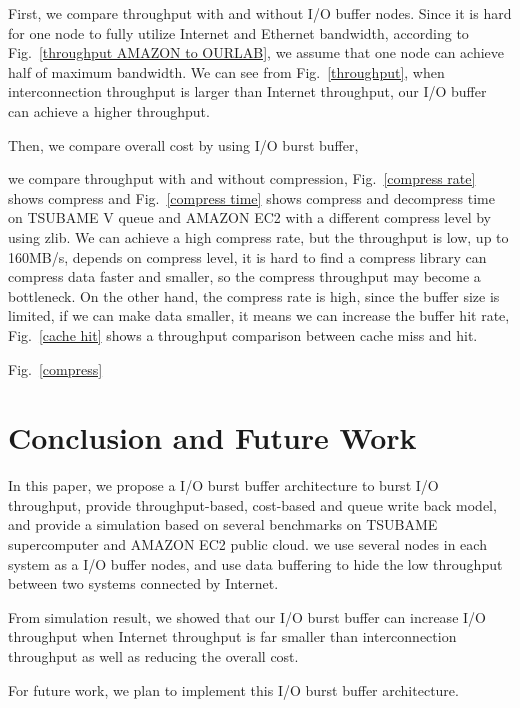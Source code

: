 \documentclass[JIP,draft]{ipsj}
\begin{document}
First, we compare throughput with and without I/O buffer nodes.
Since it is hard for one node to fully utilize Internet and Ethernet bandwidth, according to Fig.~\ref{throughput AMAZON to OURLAB}, we assume that one node can achieve half of maximum bandwidth.
We can see from Fig.~\ref{throughput}, when interconnection throughput is larger than Internet throughput, our I/O buffer can achieve a higher throughput.

Then, we compare overall cost by using I/O burst buffer, 

we compare throughput with and without compression, Fig.~\ref{compress rate} shows compress and Fig.~\ref{compress time} shows compress and decompress time on TSUBAME V queue and AMAZON EC2 with a different compress level by using zlib\cite{zlib}.
We can achieve a high compress rate, but the throughput is low, up to 160MB/s, depends on compress level, it is hard to find a compress library can compress data faster and smaller, so the compress throughput may become a bottleneck.
On the other hand, the compress rate is high, since the buffer size is limited, if we can make data smaller, it means we can increase the buffer hit rate, Fig.~\ref{cache hit} shows a throughput comparison between cache miss and hit.

Fig.~\ref{compress}
\section{Conclusion and Future Work}

In this paper, we propose a I/O burst buffer architecture to burst I/O throughput, provide throughput-based, cost-based and queue write back model, and provide a simulation based on several benchmarks on TSUBAME supercomputer and AMAZON EC2 public cloud.
we use several nodes in each system as a I/O buffer nodes, and use data buffering to hide the low throughput between two systems connected by Internet.

From simulation result, we showed that our I/O burst buffer can increase I/O throughput when Internet throughput is far smaller than interconnection throughput as well as reducing the overall cost.

For future work, we plan to implement this I/O burst buffer architecture.

\end{document}
